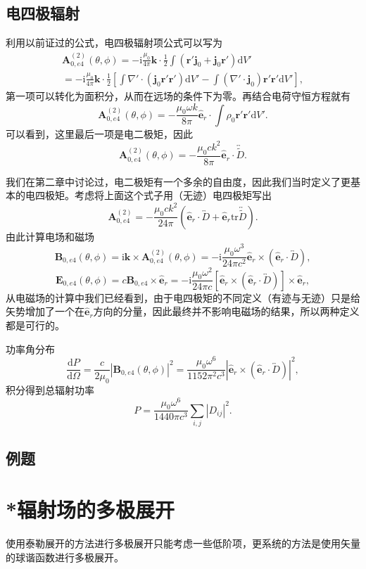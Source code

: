 \documentclass[UTF8]{ctexbook}
\renewcommand{\d}{\mathrm{d}}
\renewcommand{\b}{\boldsymbol}
\renewcommand{\i}{\mathrm{i}}
\renewcommand{\t}{\overleftrightarrow}
\numberwithin{equation}{chapter}
\begin{document}
	\subsection{电四极辐射}
	利用以前证过的公式，电四极辐射项公式可以写为
	\begin{multline*}
		\b{A}_{0,e4}^{(2)}(\theta,\phi)=-\i\frac{\mu_0}{4\pi}\b{k}\cdot\frac{1}{2}\int(\b{r}'\b{j}_0+\b{j}_0\b{r}')\d V' \\
		=-\i\frac{\mu_0}{4\pi}\b{k}\cdot\frac{1}{2}\left[\int\nabla'\cdot(\b{j}_0\b{r}'\b{r}')\d V'-\int(\nabla'\cdot\b{j}_0)\b{r}'\b{r}'\d V'\right],
	\end{multline*}
	第一项可以转化为面积分，从而在远场的条件下为零。再结合电荷守恒方程就有
	\[\b{A}_{0,e4}^{(2)}(\theta,\phi)=-\frac{\mu_0\omega k}{8\pi}\hat{\b{e}}_r\cdot\int\rho_0\b{r}'\b{r}'\d V'.\]
	可以看到，这里最后一项是电二极矩，因此
	\[\b{A}_{0,e4}^{(2)}(\theta,\phi)=-\frac{\mu_0ck^2}{8\pi}\hat{\b{e}}_r\cdot\t{\tilde{D}}.\]
	
	我们在第二章中讨论过，电二极矩有一个多余的自由度，因此我们当时定义了更基本的电四极矩。考虑将上面这个式子用（无迹）电四极矩写出
	\[\b{A}_{0,e4}^{(2)}=-\frac{\mu_0ck^2}{24\pi}(\hat{\b{e}}_r\cdot\t{D}+\hat{\b{e}}_r\mathrm{tr}\t{\tilde{D}}).\]
	由此计算电场和磁场
	\[\b{B}_{0,e4}(\theta,\phi)=\i\b{k}\times\b{A}_{0,e4}^{(2)}(\theta,\phi)=-\i\frac{\mu_0\omega^3}{24\pi c^2}\hat{\b{e}}_r\times(\hat{\b{e}}_r\cdot\t{D}),\]
	\[\b{E}_{0,e4}(\theta,\phi)=c\b{B}_{0,e4}\times\hat{\b{e}}_r=-\i\frac{\mu_0\omega^2}{24\pi c}\left[\hat{\b{e}}_r\times(\hat{\b{e}}_r\cdot\t{D})\right]\times\hat{\b{e}}_r,\]
	从电磁场的计算中我们已经看到，由于电四极矩的不同定义（有迹与无迹）只是给矢势增加了一个在$\hat{\b{e}}_r$方向的分量，因此最终并不影响电磁场的结果，所以两种定义都是可行的。
	
	功率角分布
	\[\frac{\d P}{\d \Omega}=\frac{c}{2\mu_0}|\b{B}_{0,e4}(\theta,\phi)|^2=\frac{\mu_0\omega^6}{1152\pi^2c^3}|\hat{\b{e}}_r\times(\hat{\b{e}}_r\cdot\t{D})|^2,\]
	积分得到总辐射功率
	\[P=\frac{\mu_0\omega^6}{1440\pi c^3}\sum_{i,j}|D_{ij}|^2.\]
	
	\subsection{例题}
	
	
	\section{*辐射场的多极展开}
	使用泰勒展开的方法进行多极展开只能考虑一些低阶项，更系统的方法是使用矢量的球谐函数进行多极展开。
	
\end{document}
